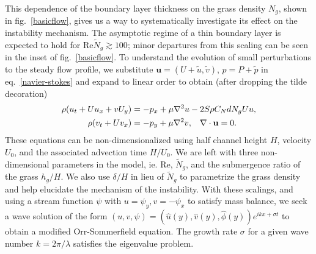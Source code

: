 \documentclass[aps,prl,twocolumn,superscriptaddress,10pt]{revtex4-1}  %
\newcommand{\bu}{\mathbf{u}}
\newcommand{\Rey}{\text{Re}}
\newcommand{\Ndg}{\tilde{N}_g}
\begin{document}
This dependence of the boundary layer thickness on the grass density $N_g$, shown in fig.~\ref{basicflow}, gives us a way to systematically investigate its effect on the instability mechanism.
The asymptotic regime of a thin boundary layer is expected to hold for $\Rey \Ndg \gtrsim 100$; minor departures from this scaling can be seen in the inset of fig.~\ref{basicflow}.
\newline
To understand the evolution of small perturbations to the steady flow profile, we substitute $\bu = (U+\tilde{u}, \tilde{v})$, $p=P+\tilde{p}$ in eq.~\eqref{navier-stokes} and expand to linear order to obtain (after dropping the tilde decoration)
\begin{equation}
\begin{split}
\rho(u_t+U u_x+vU_y) &= -p_x+ {\mu}\nabla^2u-2S\rho C_{N}dN_{g}Uu, \\
\rho(v_t+ Uv_x) &= -p_y+ {\mu}\nabla^2v, \hspace{0.3cm} \nabla\cdot\bu=0.
\end{split}
\end{equation}
These equations can be non-dimensionalized using half channel height $H$, velocity $U_0$, and the associated advection time $H/U_0$. 
We are left with three non-dimensional parameters in the model, ie. $\Rey$, $\Ndg$, and the submergence ratio of the grass $h_g/H$. 
We also use $\delta/H$ in lieu of $\Ndg$ to parametrize the grass density and help elucidate the mechanism of the instability. 
With these scalings, and using a stream function $\psi$ with $u = \psi_{y}, v= -\psi_x$ to satisfy mass balance, we seek a wave solution of 
the form $\left(u,v,\psi \right)= \left(\hat u(y), \hat v(y), \hat\phi(y) \right)e^{ikx+\sigma t}$ to  obtain a modified Orr-Sommerfield equation. 
The growth rate $\sigma$ for a given wave number $k=2\pi /\lambda$ satisfies the eigenvalue problem.
\end{document}
